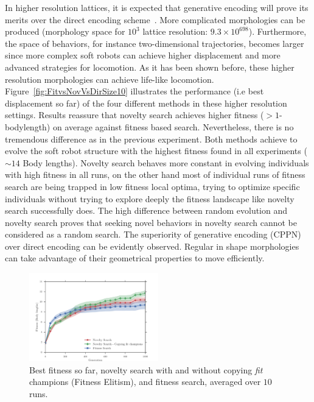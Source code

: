 \documentclass{sig-alternate}
\begin{document}
In higher resolution lattices, it is expected that generative encoding will prove its merits over the direct encoding scheme~\cite{cheney2013unshackling,stanley2007compositional}. More complicated morphologies can be produced (morphology space for $10^3$ lattice resolution: $9.3 \times 10^{698}$). Furthermore, the space of behaviors, for instance two-dimensional trajectories, becomes larger since more complex soft robots can achieve higher displacement and more advanced strategies for locomotion. As it has been shown before, these higher resolution morphologies can achieve life-like locomotion. Figure~\ref{fig:FitvsNovVsDirSize10} illustrates the performance (i.e best displacement so far) of the four different methods in these higher resolution settings. Results reassure that novelty search achieves higher fitness ($> 1$-bodylength) on average against fitness based search. Nevertheless, there is no tremendous difference as in the previous experiment. Both methods achieve to evolve the soft robot structure with the highest fitness found in all experiments ($\sim 14$ Body lengths). Novelty search behaves more constant in evolving individuals with high fitness in all runs, on the other hand most of individual runs of fitness search are being trapped in low fitness local optima, trying to optimize specific individuals without trying to explore deeply the fitness landscape like novelty search successfully does. The high difference between random evolution and novelty search proves that seeking novel behaviors in novelty search cannot be considered as a random search. The superiority of generative encoding (CPPN) over direct encoding can be evidently observed. Regular in shape morphologies can take advantage of their geometrical properties to move efficiently.

\begin{figure}[h!]
\centering
\includegraphics[width=0.5\textwidth]{../Figures/Results/CopyFitChampions10.pdf}
\caption{Best fitness so far, novelty search with and without copying \emph{fit} champions (Fitness Elitism), and fitness search, averaged over $10$ runs.}
\label{fig:CopyFitChampions10}
\end{figure}
\end{document}
